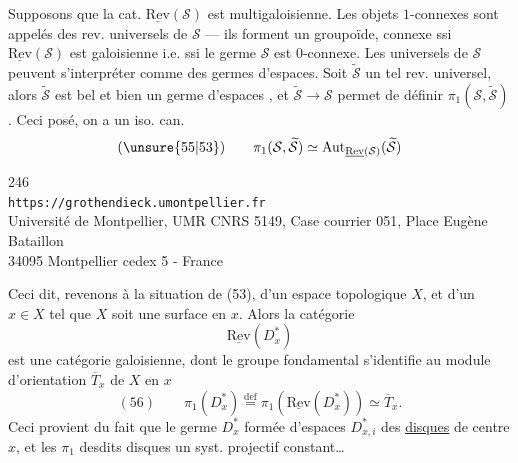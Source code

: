 Supposons   que la cat. $\underline{\mathrm{Rev}}(\mathcal S)$ est  multigaloisienne. Les objets $1$-connexes sont appelés des rev. universels de $\mathcal S$ ---  ils forment un groupoïde, connexe ssi $\underline{\mathrm{Rev}}(\mathcal S)$ est galoisienne i.e. ssi le germe $\mathcal S$ est $0$-connexe. Les  universels de $\mathcal S$ peuvent s'interpréter comme des germes d'espaces. Soit $\widetilde{\mathcal S}$ un tel rev. universel, alors $\widetilde{\mathcal S}$ est bel et bien un germe d'espaces , et $\widetilde{\mathcal S}\longrightarrow\mathcal S$ permet de définir $\pi_1(\mathcal S,\widetilde{\mathcal S})$. Ceci posé, on a un iso. can.
\[
(\unsure{55|53})\qquad \pi_1(\mathcal S,\widetilde{\mathcal S})\simeq\mathrm{Aut}_{\underline{\mathrm{Rev}}(\mathcal S)}(\widetilde{\mathcal S})
\]




\begin{center}
246\\
\texttt{https://grothendieck.umontpellier.fr}\\
Université de Montpellier, UMR CNRS 5149, Case courrier 051, Place Eugène Bataillon\\
34095 Montpellier cedex 5 - France
\end{center}

Ceci dit, revenons à la situation de (53), d'un espace topologique $X$, et d'un $x\in X$ tel que $X$ soit une surface en $x$. Alors la catégorie 
\[
\underline{\mathrm{Rev}}(D_x^*)
\]
est une catégorie galoisienne,  dont le groupe fondamental s'identifie  au module d'orientation $\overline T_x$ de $X$ en $x$
\[
(56)\qquad \pi_1(D_x^*)\overset{\mathrm{def}}=\pi_1(\underline{\mathrm{Rev}}(D_x^*))\simeq\overline T_x.
\]
Ceci provient du fait que le germe $D_x^*$   formée d'espaces $D_{x,i}^*$   des \uline{disques} de centre $x$, et les $\pi_1$ desdits disques  un syst. projectif constant\ldots

